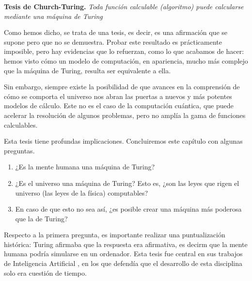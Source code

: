 \begin{adjustwidth}{30pt}{}
    \textbf{Tesis de Church-Turing.} \emph{Toda función calculable (algoritmo) puede calcularse mediante una máquina de Turing}
\end{adjustwidth}

Como hemos dicho, se trata de una tesis, es decir, es una afirmación que se supone pero que no se demuestra. Probar este resultado es prácticamente imposible, pero hay evidencias que lo refuerzan, como lo que acabamos de hacer: hemos visto cómo un modelo de computación, en apariencia, mucho más complejo que la máquina de Turing, resulta ser equivalente a ella.

Sin embargo, siempre existe la posibilidad de que avances en la comprensión de cómo se comporta el universo nos abran las puertas a nuevos y más potentes modelos de cálculo. Este no es el caso de la computación cuántica, que puede acelerar la resolución de algunos problemas, pero no amplía la gama de funciones calculables. \cite{Kaye2007}

Esta tesis tiene profundas implicaciones. Concluiremos este capítulo con algunas preguntas.

\begin{enumerate}
    \item ¿Es la mente humana una máquina de Turing?
    \item ¿Es el universo una máquina de Turing? Esto es, ¿son las leyes que rigen el universo (las leyes de la física) computables?
    \item En caso de que esto no sea así, ¿es posible crear una máquina más poderosa que la de Turing?
\end{enumerate}

Respecto a la primera pregunta, es importante realizar una puntualización histórica: Turing afirmaba que la respuesta era afirmativa, es decirm que la mente humana podría simularse en un ordenador. Esta tesis fue central en sus trabajos de Inteligencia Artificial \cite{Turing1950}, en los que defendía que el desarrollo de esta disciplina solo era cuestión de tiempo.



